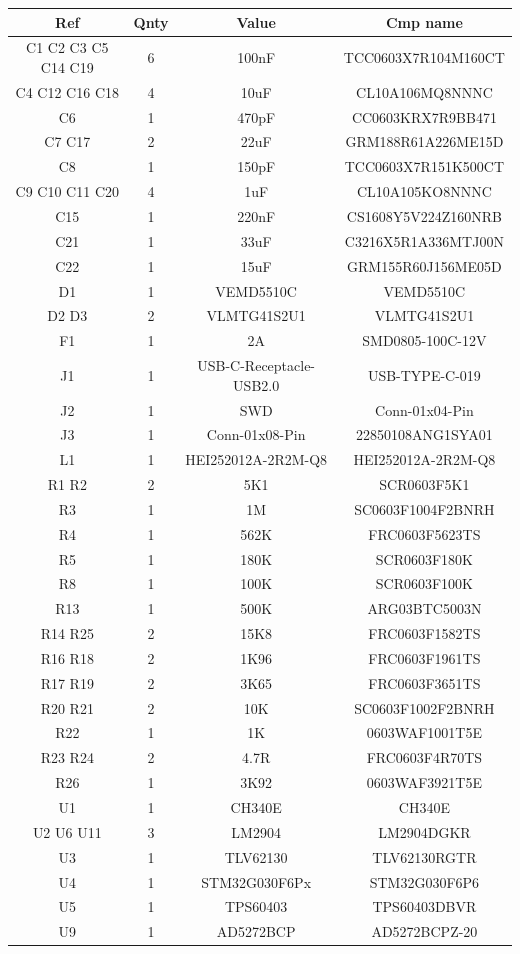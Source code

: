 \documentclass[a4paper]{ctexart}
\begin{document}
\begin{appendices}
	\begin{tabular}{c|c|c|c}
		Ref&Qnty&Value&Cmp name\\
		\hline
		C1 C2 C3 C5 C14 C19&6&100nF&TCC0603X7R104M160CT\\
		C4 C12 C16 C18&4&10uF&CL10A106MQ8NNNC\\
		C6&1&470pF&CC0603KRX7R9BB471\\
		C7 C17&2&22uF&GRM188R61A226ME15D\\
		C8&1&150pF&TCC0603X7R151K500CT\\
		C9 C10 C11 C20&4&1uF&CL10A105KO8NNNC\\
		C15&1&220nF&CS1608Y5V224Z160NRB\\
		C21&1&33uF&C3216X5R1A336MTJ00N\\
		C22&1&15uF&GRM155R60J156ME05D\\
		D1&1&VEMD5510C&VEMD5510C\\
		D2 D3&2&VLMTG41S2U1&VLMTG41S2U1\\
		F1&1&2A&SMD0805-100C-12V\\
		J1&1&USB-C-Receptacle-USB2.0&USB-TYPE-C-019\\
		J2&1&SWD&Conn-01x04-Pin\\
		J3&1&Conn-01x08-Pin&22850108ANG1SYA01\\
		L1&1&HEI252012A-2R2M-Q8&HEI252012A-2R2M-Q8\\
		R1 R2&2&5K1&SCR0603F5K1\\
		R3&1&1M&SC0603F1004F2BNRH\\
		R4&1&562K&FRC0603F5623TS\\
		R5&1&180K&SCR0603F180K\\
		R8&1&100K&SCR0603F100K\\
		R13&1&500K&ARG03BTC5003N\\
		R14 R25&2&15K8&FRC0603F1582TS\\
		R16 R18&2&1K96&FRC0603F1961TS\\
		R17 R19&2&3K65&FRC0603F3651TS\\
		R20 R21&2&10K&SC0603F1002F2BNRH\\
		R22&1&1K&0603WAF1001T5E\\
		R23 R24&2&4.7R&FRC0603F4R70TS\\
		R26&1&3K92&0603WAF3921T5E\\
		U1&1&CH340E&CH340E\\
		U2 U6 U11&3&LM2904&LM2904DGKR\\
		U3&1&TLV62130&TLV62130RGTR\\
		U4&1&STM32G030F6Px&STM32G030F6P6\\
		U5&1&TPS60403&TPS60403DBVR\\
		U9&1&AD5272BCP&AD5272BCPZ-20\\
	\end{tabular}
	
\end{appendices}
\end{document}
